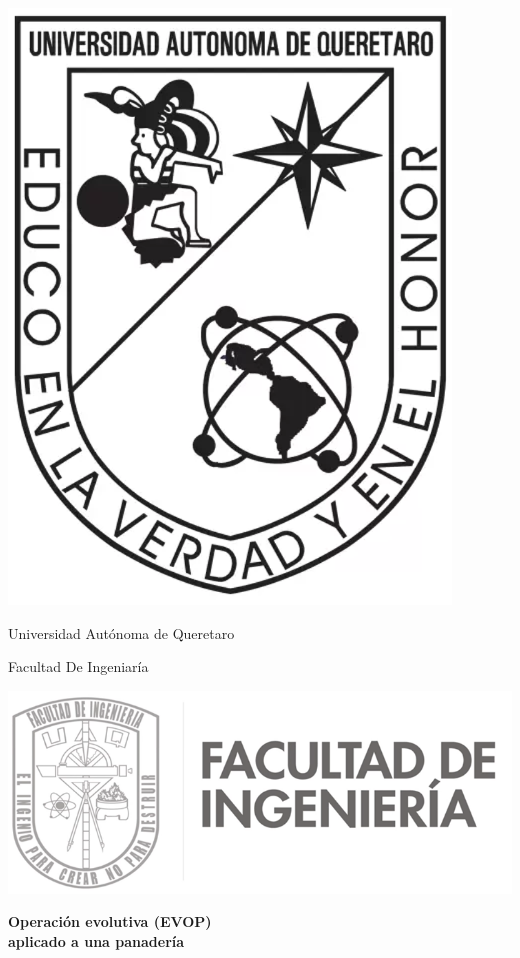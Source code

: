 \begin{titlepage}
    \centering
    
    \begin{minipage}{0.2 \textwidth}
        \centering
        \includegraphics[width=0.5 \textwidth]{rsc/format/uaq.png}
    \end{minipage}
    \hfill
    \begin{minipage}{0.4\textwidth}
        \centering
        {Universidad Autónoma de Queretaro \par}
        \vspace{0.2cm}
        {Facultad De Ingeniaría\par}
    \end{minipage}
    \hfill
    \begin{minipage}{0.3 \textwidth}
        \centering
        \includegraphics[width=1 \textwidth]{rsc/format/fi.png}
    \end{minipage}
    
    \vspace{2cm}
    
    {\LARGE \bfseries Operación evolutiva (EVOP) \\aplicado a una panadería \par}
    

\end{titlepage}
